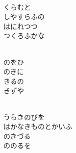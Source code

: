 \documentclass[10pt,b5j]{tarticle} %
\begin{document}
\vspace{1.5em} %
\newcommand{\linespace}{0.5em} %
\newcommand{\blocksize}{0.5\hsize} %
\newcommand{\itemmargin}{3em} %
\begin{enumerate} %
    \setlength{\itemindent}{\itemmargin} %
    \begin{minipage}[c]{\blocksize}
    
        \vspace{\linespace}
        \item~\\
        くらむと\\
        しやすらふの\\
        はにれつつ\\
        つくろふかな
        
    \end{minipage}
    \begin{minipage}[c]{\blocksize}
        
        \vspace{\linespace}
        \item~\\
        のをひ\\
        のきに\\
        きるの\\
        きずや
        
    \end{minipage}
    \begin{minipage}[c]{\blocksize}
        
        \vspace{\linespace}
        \item~\\
        うらきのびを\\
        はかなきものとかいふ\\
        のきづる\\
        ののるを
        

\end{minipage}
\end{enumerate}
\end{document}
